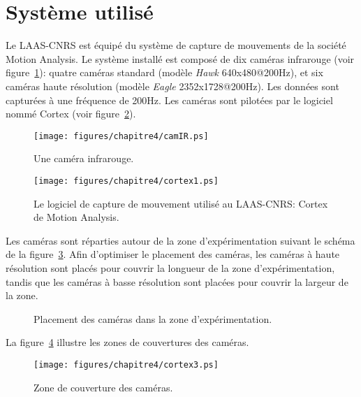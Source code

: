 \section{Système utilisé}
Le LAAS-CNRS est équipé du système de capture de mouvements de la société Motion Analysis.
Le système installé est composé de dix caméras infrarouge (voir figure~\ref{fig:cameraIR}): quatre caméras
standard (modèle \emph{Hawk} 640x480@200Hz), et six caméras haute résolution (modèle \emph{Eagle} 2352x1728@200Hz). 
Les données sont capturées à une fréquence de 200Hz. Les caméras sont pilotées par le 
logiciel nommé Cortex (voir figure~\ref{fig:cortex1}).
\begin{figure}[p]
  \begin{center}
    \texttt{[image: figures/chapitre4/camIR.ps]}
  \end{center}
  \caption{Une caméra infrarouge.}
  \label{fig:cameraIR}
\end{figure}
\begin{figure}[p]
  \begin{center}
    \texttt{[image: figures/chapitre4/cortex1.ps]}
  \end{center}
  \caption[Logiciel de capture de mouvements.]{Le logiciel de capture de mouvement utilisé au LAAS-CNRS: Cortex de Motion Analysis.}
  \label{fig:cortex1}
\end{figure}
Les caméras sont réparties autour de la zone d'expérimentation suivant le schéma de la figure~\ref{fig:cameraSetUp}.
Afin d'optimiser le placement des caméras, les caméras à haute résolution 
sont placés pour couvrir la longueur de la zone d'expérimentation, tandis que les 
caméras à basse résolution sont placées pour couvrir la largeur de la zone.
\begin{figure}[p]
  \begin{center}
    \resizebox{0.94\linewidth}{!}{
      
    }
  \end{center}
  \caption{Placement des caméras dans la zone d'expérimentation.}
  \label{fig:cameraSetUp}
\end{figure}
La figure~\ref{fig:cameraCoverage} illustre les zones de couvertures des caméras.
\begin{figure}[p]
  \begin{center}
    \texttt{[image: figures/chapitre4/cortex3.ps]}
  \end{center}
  \caption{Zone de couverture des caméras.}
  \label{fig:cameraCoverage}
\end{figure}

